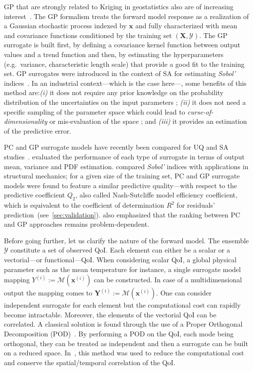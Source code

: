 GP that are strongly related to Kriging in geostatistics also are of increasing interest~\citep{rasmussen2006,legratiet2017,lockwood2012,marrel2015}. The GP formalism treats the forward model response as a realization of a Gaussian stochastic process indexed by $\mathbf{x}$ and fully characterized with mean and covariance functions conditioned by the training set $(\mathbf{X}, \mathcal{Y})$. The GP surrogate is built first, by defining a covariance kernel function between output values and a trend function and then, by estimating the hyperparameters (e.g.~variance, characteristic length scale) that provide a good fit to the training set. GP surrogates were introduced in the context of SA for estimating \emph{Sobol'} indices~\citep{oakley2004,marrel2009,legratiet2014}. In an industrial context---which is the case here---, some benefits of this method are:\textit{(i)} it does not require any prior knowledge on the probability distribution of the uncertainties on the input parameters ; \textit{(ii)} it does not need a specific sampling of the parameter space which could lead to \textit{curse-of-dimensionality} or mis-evaluation of the space ; and \textit{(iii)} it provides an estimation of the predictive error.

PC and GP surrogate models have recently been compared for UQ and SA studies~\citep{legratiet2017,owen2015,schoebi2015}. \citet{owen2015} evaluated the performance of each type of surrogate in terms of output mean, variance and PDF estimation. \citet{legratiet2017} compared \emph{Sobol'} indices with applications in structural mechanics; for a given size of the training set, PC and GP surrogate models were found to feature a similar predictive quality---with respect to the predictive coefficient $Q_2$, also called Nash-Sutcliffe model efficiency coefficient, which is equivalent to the coefficient of determination $R^2$ for residuals' prediction~\citep{krause2005}(see~\cref{sec:validation}). \citet{legratiet2017} also emphasized that the ranking between PC and GP approaches remains problem-dependent.

Before going further, let us clarify the nature of the forward model. The ensemble $\mathcal{Y}$ constitute a set of observed QoI. Each element can either be a scalar or a vectorial---or functional---QoI. When considering scalar QoI, a global physical parameter such as the mean temperature for instance, a single surrogate model mapping $Y^{(i)} := \mathcal{M}(\mathbf{x}^{(i)})$ can be constructed. In case of a multidimensional output the mapping comes to $\mathbf{Y}^{(i)} := \mathcal{M}(\mathbf{x}^{(i)})$. One can consider independent surrogate for each element but the computational cost can rapidly become intractable. Moreover, the elements of the vectorial QoI can be correlated. A classical solution is found through the use of a Proper Orthogonal Decomposition (POD)~\cite{anindyachatterjee2000}. By performing a POD on the QoI, each mode being orthogonal, they can be treated as independent and then a surrogate can be built on a reduced space. In~\cite{braconnier2011,margheri2016}, this method was used to reduce the computational cost and conserve the spatial/temporal correlation of the QoI.

